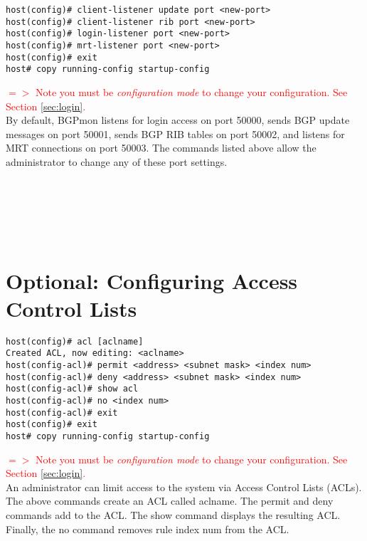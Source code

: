 \documentclass{article}
\newcommand\note[1]{\textcolor{red}{$=>$ #1}}
\begin{document}
\begin{Verbatim}[frame=single]
host(config)# client-listener update port <new-port>
host(config)# client-listener rib port <new-port>
host(config)# login-listener port <new-port>
host(config)# mrt-listener port <new-port>
host(config)# exit
host# copy running-config startup-config
\end{Verbatim}
\note{Note you must be \emph{configuration mode} to change your configuration.   See Section \ref{sec:login}.}
\\
By default, BGPmon listens for login access on port 50000,  sends BGP update messages on port 50001,  sends BGP RIB tables on port 50002, and listens for MRT connections on port 50003.  The commands listed above allow the administrator to change any of these port settings.
\\
\\
\\
\\
\\
\\

\section{Optional: Configuring Access Control Lists}
\label{sec:acl}

\begin{Verbatim}[frame=single]
host(config)# acl [aclname]
Created ACL, now editing: <aclname>
host(config-acl)# permit <address> <subnet mask> <index num>
host(config-acl)# deny <address> <subnet mask> <index num>
host(config-acl)# show acl
host(config-acl)# no <index num>
host(config-acl)# exit
host(config)# exit
host# copy running-config startup-config
\end{Verbatim}
\note{Note you must be \emph{configuration mode} to change your configuration.   See Section \ref{sec:login}.}
\\
An administrator can limit access to the system via Access Control Lists (ACLs).   The above commands create an ACL called aclname.   The permit and deny commands add to the ACL.   The show command displays the resulting ACL.   Finally, the no command removes rule index num from the ACL.
\end{document}
